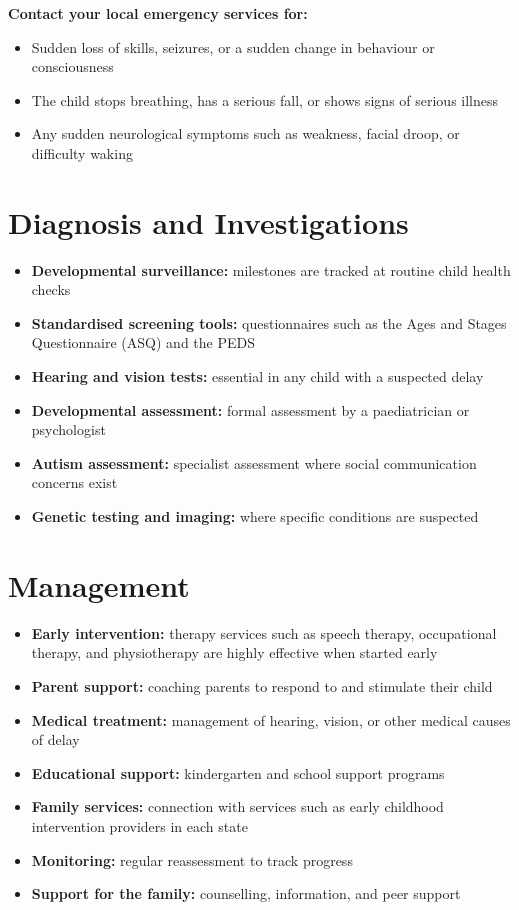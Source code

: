 \textbf{Contact your local emergency services for:}
\begin{itemize}
    \item Sudden loss of skills, seizures, or a sudden change in behaviour or consciousness
    \item The child stops breathing, has a serious fall, or shows signs of serious illness
    \item Any sudden neurological symptoms such as weakness, facial droop, or difficulty waking
\end{itemize}

\section*{Diagnosis and Investigations}
\begin{itemize}
    \item \textbf{Developmental surveillance:} milestones are tracked at routine child health checks
    \item \textbf{Standardised screening tools:} questionnaires such as the Ages and Stages Questionnaire (ASQ) and the PEDS
    \item \textbf{Hearing and vision tests:} essential in any child with a suspected delay
    \item \textbf{Developmental assessment:} formal assessment by a paediatrician or psychologist
    \item \textbf{Autism assessment:} specialist assessment where social communication concerns exist
    \item \textbf{Genetic testing and imaging:} where specific conditions are suspected
\end{itemize}

\section*{Management}
\begin{itemize}
    \item \textbf{Early intervention:} therapy services such as speech therapy, occupational therapy, and physiotherapy are highly effective when started early
    \item \textbf{Parent support:} coaching parents to respond to and stimulate their child
    \item \textbf{Medical treatment:} management of hearing, vision, or other medical causes of delay
    \item \textbf{Educational support:} kindergarten and school support programs
    \item \textbf{Family services:} connection with services such as early childhood intervention providers in each state
    \item \textbf{Monitoring:} regular reassessment to track progress
    \item \textbf{Support for the family:} counselling, information, and peer support
\end{itemize}

